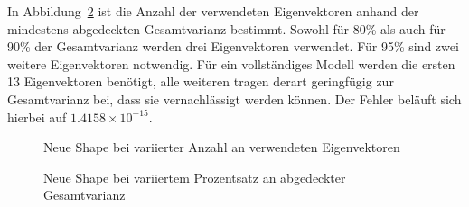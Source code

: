 \documentclass[]{report}
\newlength\figureheight
\newlength\figurewidth
\begin{document}
\begin{enumerate}
\begin{enumerate}
			In Abbildung~\ref{fig:shapesVar} ist die Anzahl der verwendeten Eigenvektoren anhand der mindestens abgedeckten Gesamtvarianz bestimmt. Sowohl für 80\% als auch für 90\% der Gesamtvarianz werden drei Eigenvektoren verwendet. Für 95\% sind zwei weitere Eigenvektoren notwendig. Für ein vollständiges Modell werden die ersten 13 Eigenvektoren benötigt, alle weiteren tragen derart geringfügig zur Gesamtvarianz bei, dass sie vernachlässigt werden können. Der Fehler beläuft sich hierbei auf $1.4158\times 10^{-15}$.
			\setlength\figureheight{4cm}
			\setlength{}
			\begin{figure}
				\centering
				
				\caption{Neue Shape bei variierter Anzahl an verwendeten Eigenvektoren}
				\label{fig:shapesK}
			\end{figure}
			\qquad
			\begin{figure}
				\centering
				
				\caption{Neue Shape bei variiertem Prozentsatz an abgedeckter Gesamtvarianz}
				\label{fig:shapesVar}
			\end{figure}
		\end{enumerate}
	\end{enumerate}
	
\end{document}
